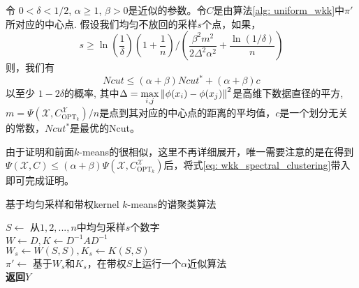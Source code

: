 \begin{theorem}[均匀不放回采样的谱聚类解的质量2]
    \label{theo: uniform_wkk_sharper}
    令 $0 < \delta <1/2$, $\alpha \geq 1$, $\beta >0$是近似的参数。令$C$是由算法\ref{alg: uniform_wkk}中$\pi'$所对应的中心点. 假设我们均匀不放回的采样$s$个点，如果，
    \begin{equation}
    s \geq \ln(\frac{1}{\delta})(1+\frac{1}{n})/(\frac{\beta^2 m^2}{2\Delta^2 \alpha^2}+\frac{\ln(1/\delta)}{n})
    \end{equation}
    则，我们有
    \begin{equation}
    Ncut \leq (\alpha + \beta) Ncut^* + (\alpha + \beta)c
    \end{equation}
    以至少 $1-2\delta$的概率, 其中$\Delta = \max\limits_{i,j}\left\lVert\phi(x_i) - \phi(x_j)\right\rVert^2$是高维下数据直径的平方, $m = \Psi(\mathcal{X},C_{\text{OPT}_k}^{\mathcal{X}})/n$是点到其对应的中心点的距离的平均值，$c$是一个划分无关的常数，$Ncut^*$是最优的Ncut。
\end{theorem}
由于证明和前面$k$-means的很相似，这里不再详细展开，唯一需要注意的是在得到$\Psi(\mathcal{X},C) \leq (\alpha+\beta) \Psi(\mathcal{X},C_{\text{OPT}_k}^{\mathcal{X}})$后，将式\ref{eq: wkk_spectral_clustering}带入即可完成证明。
\begin{algorithm}
	\SetNoFillComment
    \caption{基于均匀采样和带权kernel $k$-means的谱聚类算法}\label{alg: uniform_wkk}
    $S \gets$ 从$1,2,...,n$中均匀采样$s$个数字\\
    $W \gets D,K \gets D^{-1}AD^{-1}$\\
    $W_s \gets W(S,S), K_s \gets K(S,S)$\\
    $\pi' \gets$ 基于$W_s$和$K_s$，在带权$S$上运行一个$\alpha$近似算法\\
    \textbf{返回}$Y$
\end{algorithm}
